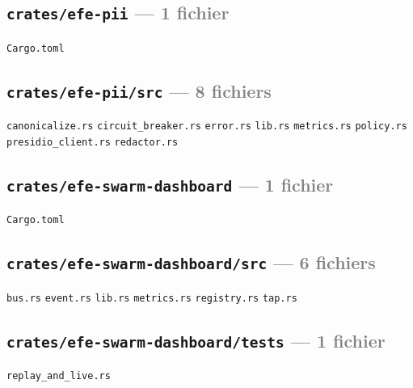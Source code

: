 \documentclass[10pt]{report}
\newcommand{\code}[1]{\texttt{\small #1}}
\begin{document}
\subsection*{\code{crates/efe-pii} \normalfont\textcolor{grey}{--- 1 fichier}}
\begin{sloppypar}\footnotesize\raggedright
\code{Cargo.toml}
\end{sloppypar}

\subsection*{\code{crates/efe-pii/src} \normalfont\textcolor{grey}{--- 8 fichiers}}
\begin{sloppypar}\footnotesize\raggedright
\code{canonicalize.rs} \;\textbullet\; \code{circuit\_breaker.rs} \;\textbullet\; \code{error.rs} \;\textbullet\; \code{lib.rs} \;\textbullet\; \code{metrics.rs} \;\textbullet\; \code{policy.rs} \;\textbullet\; \code{presidio\_client.rs} \;\textbullet\; \code{redactor.rs}
\end{sloppypar}

\subsection*{\code{crates/efe-swarm-dashboard} \normalfont\textcolor{grey}{--- 1 fichier}}
\begin{sloppypar}\footnotesize\raggedright
\code{Cargo.toml}
\end{sloppypar}

\subsection*{\code{crates/efe-swarm-dashboard/src} \normalfont\textcolor{grey}{--- 6 fichiers}}
\begin{sloppypar}\footnotesize\raggedright
\code{bus.rs} \;\textbullet\; \code{event.rs} \;\textbullet\; \code{lib.rs} \;\textbullet\; \code{metrics.rs} \;\textbullet\; \code{registry.rs} \;\textbullet\; \code{tap.rs}
\end{sloppypar}

\subsection*{\code{crates/efe-swarm-dashboard/tests} \normalfont\textcolor{grey}{--- 1 fichier}}
\begin{sloppypar}\footnotesize\raggedright
\code{replay\_and\_live.rs}
\end{sloppypar}
\end{document}
